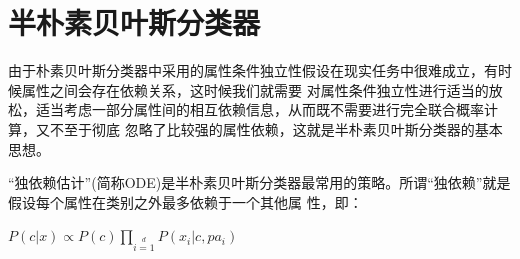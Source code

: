 \documentclass[UTF8]{ctexart}
\begin{document}
{\section{半朴素贝叶斯分类器}
由于朴素贝叶斯分类器中采用的属性条件独立性假设在现实任务中很难成立，有时候属性之间会存在依赖关系，这时候我们就需要
对属性条件独立性进行适当的放松，适当考虑一部分属性间的相互依赖信息，从而既不需要进行完全联合概率计算，又不至于彻底
忽略了比较强的属性依赖，这就是半朴素贝叶斯分类器的基本思想。\par
“独依赖估计”(简称ODE)是半朴素贝叶斯分类器最常用的策略。所谓“独依赖”就是假设每个属性在类别之外最多依赖于一个其他属
性，即：
\begin{center}
    \LARGE{
        $P(c|x)\propto P(c)\prod\limits_{i=1}\limits^dP(x_i|c,pa_i)$
    }
\end{center}
}
\end{document}
